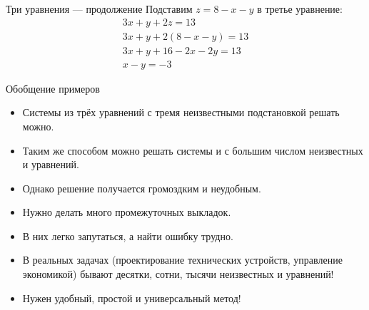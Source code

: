 \documentclass[12pt,aspectratio=169]{beamer}
\begin{document}
\begin{frame}{Три уравнения --- продолжение}
    Подставим $z = 8 - x - y$ в третье уравнение:
    \[
        \begin{array}{rcl}
             3x + y + 2z = 13 \\
             3x + y + 2(8 - x - y) = 13 \\
             3x + y + 16 - 2x - 2y = 13 \\
             x - y = -3
        \end{array}
    \]
\end{frame}

\begin{frame}{Обобщение примеров}
    \begin{itemize}
        \item<1-> Системы из трёх уравнений с тремя неизвестными подстановкой решать можно.
        \item<2-> Таким же способом можно решать системы и с большим числом неизвестных и уравнений.
        \item<3-> Однако решение получается громоздким и неудобным.
        \item<4-> Нужно делать много промежуточных выкладок.
        \item<5-> В них легко запутаться, а найти ошибку трудно.
        \item<6-> В реальных задачах (проектирование технических устройств, управление экономикой) бывают десятки, сотни, тысячи неизвестных и уравнений!
        \item<7-> Нужен удобный, простой и универсальный метод!
    \end{itemize}
\end{frame}
\end{document}
